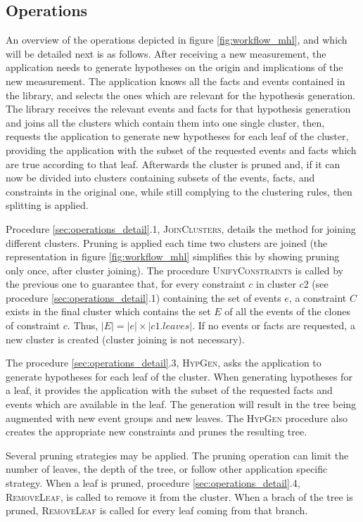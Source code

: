 \subsection{Operations}
An overview of the operations depicted in figure \ref{fig:workflow_mhl}, and which will be detailed next is as follows. After receiving a new measurement, the application needs to generate hypotheses on the origin and implications of the new measurement. The application knows all the facts and events contained in the library, and selects the ones which are relevant for the hypothesis generation. The library receives the relevant events and facts for that hypothesis generation and joins all the clusters which contain them into one single cluster, then, requests the application to generate new hypotheses for each leaf of the cluster, providing the application with the subset of the requested events and facts which are true according to that leaf. Afterwards the cluster is pruned and, if it can now be divided into clusters containing subsets of the events, facts, and constraints in the original one, while still complying to the clustering rules, then splitting is applied.

Procedure \ref{sec:operations_detail}.1, \textsc{JoinClusters}, details the method for joining different clusters. Pruning is applied each time two clusters are joined (the representation in figure \ref{fig:workflow_mhl} simplifies this by showing pruning only once, after cluster joining).
The procedure \textsc{UnifyConstraints} is called by the previous one to guarantee that, for every constraint $c$ in cluster $c2$ (see procedure \ref{sec:operations_detail}.1) containing the set of events $e$, a constraint $C$ exists in the final cluster which contains the set $E$ of all the events of the clones of constraint $c$. Thus, $|E| = |e| \times |c1.leaves|$. If no events or facts are requested, a new cluster is created (cluster joining is not necessary).

The procedure \ref{sec:operations_detail}.3, \textsc{HypGen}, asks the application to generate hypotheses for each leaf of the cluster. When generating hypotheses for a leaf, it provides the application with the subset of the requested facts and events which are available in the leaf. The generation will result in the tree being augmented with new event groups and new leaves. The \textsc{HypGen} procedure also creates the appropriate new constraints and prunes the resulting tree.

Several pruning strategies may be applied. The pruning operation can limit the number of leaves, the depth of the tree, or follow other application specific strategy. When a leaf is pruned, procedure \ref{sec:operations_detail}.4, \textsc{RemoveLeaf}, is called to remove it from the cluster. When a brach of the tree is pruned, \textsc{RemoveLeaf} is called for every leaf coming from that branch.

